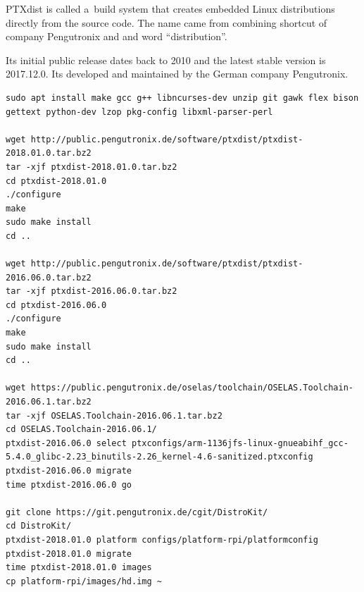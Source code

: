 \documentclass[printmode]{mgr}
\begin{document}
PTXdist is called a~build system that creates embedded Linux distributions directly from the source code. The name came from combining shortcut of company Pengutronix and and word ``distribution''.

Its initial public release dates back to 2010 and the latest stable version is 2017.12.0. Its developed and maintained by the German company Pengutronix.













\begin{lstlisting}
sudo apt install make gcc g++ libncurses-dev unzip git gawk flex bison gettext python-dev lzop pkg-config libxml-parser-perl

wget http://public.pengutronix.de/software/ptxdist/ptxdist-2018.01.0.tar.bz2
tar -xjf ptxdist-2018.01.0.tar.bz2
cd ptxdist-2018.01.0
./configure
make
sudo make install
cd ..

wget http://public.pengutronix.de/software/ptxdist/ptxdist-2016.06.0.tar.bz2
tar -xjf ptxdist-2016.06.0.tar.bz2
cd ptxdist-2016.06.0
./configure
make
sudo make install
cd ..

wget https://public.pengutronix.de/oselas/toolchain/OSELAS.Toolchain-2016.06.1.tar.bz2
tar -xjf OSELAS.Toolchain-2016.06.1.tar.bz2
cd OSELAS.Toolchain-2016.06.1/
ptxdist-2016.06.0 select ptxconfigs/arm-1136jfs-linux-gnueabihf_gcc-5.4.0_glibc-2.23_binutils-2.26_kernel-4.6-sanitized.ptxconfig
ptxdist-2016.06.0 migrate
time ptxdist-2016.06.0 go

git clone https://git.pengutronix.de/cgit/DistroKit/
cd DistroKit/
ptxdist-2018.01.0 platform configs/platform-rpi/platformconfig
ptxdist-2018.01.0 migrate
time ptxdist-2018.01.0 images
cp platform-rpi/images/hd.img ~
\end{lstlisting}
\end{document}
